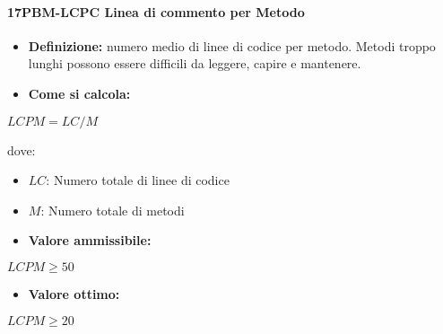 \paragraph*{17PBM-LCPC Linea di commento per Metodo}
\begin{itemize}
    \item \textbf{Definizione:} numero medio di linee di codice per metodo. Metodi troppo lunghi possono essere difficili da leggere, capire e mantenere.
    \item \textbf{Come si calcola:}
\end{itemize}
\begin{center}
   $LCPM = LC/M$ 
\end{center}
dove:
\begin{itemize}[label=$\rightarrow$]
    \item $LC$: Numero totale di linee di codice
    \item $M$: Numero totale di metodi
\end{itemize}
\begin{itemize}
    \item \textbf{Valore ammissibile:}
\end{itemize}
\begin{center}
    $LCPM \geq 50$
\end{center}
\begin{itemize}
    \item \textbf{Valore ottimo:}
\end{itemize}
\begin{center}
    $LCPM \geq 20$
\end{center}

